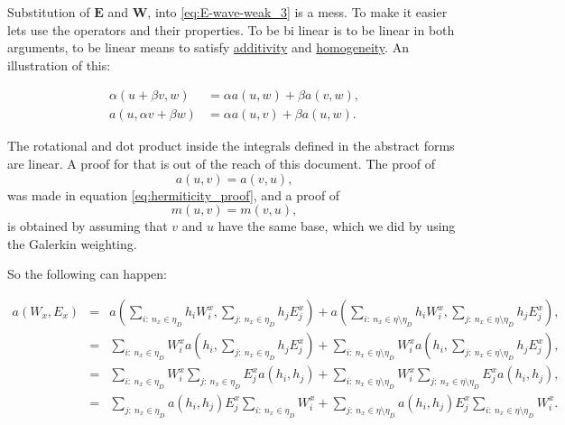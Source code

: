 Substitution of $\mathbf{E}$ and $\mathbf{W}$, into \ref{eq:E-wave-weak_3} is a mess. To make it easier lets use the operators and their properties. To be bi linear is to be linear in both arguments, to be linear means to satisfy \href{http://en.wikipedia.org/wiki/Additive_function}{additivity} and \href{http://en.wikipedia.org/wiki/Homogeneous_function}{homogeneity}. An illustration of this:

\begin{align*}
\alpha (u+\beta v, w)&=\alpha a(u,w)+\beta a(v,w),\\
a(u,\alpha v+\beta w)&=\alpha a(u,v)+\beta a(u,w).
\end{align*}

The rotational and dot product inside the integrals defined in the abstract forms are linear. A proof for that is out of the reach of this document. 
The proof of
\[a(u,v) = a(v,u),\]
was made in equation \ref{eq:hermiticity_proof}, and a proof of
\[m(u,v) = m(v,u),\]
is obtained by assuming that $v$ and $u$ have the same base, which we did by using the Galerkin weighting.

So the following can happen:

\begin{align}
a\left(W_x,E_x\right)&=& a\left( \sum_{i:\ n_x \in \eta_D} h_i W_i^x, \sum_{j:\ n_x \in \eta_D} h_j E_j^x\right)+a\left(\sum_{i:\ n_x \in \eta\setminus\eta_D} h_i W_i^x,\sum_{j:\ n_x \in \eta\setminus\eta_D} h_j E_j^x\right)\nonumber, \\
&=&  \sum_{i:\ n_x \in \eta_D}W_i^x a\left(  h_i , \sum_{j:\ n_x \in \eta_D} h_j E_j^x\right)+\sum_{i:\ n_x \in \eta\setminus\eta_D} W_i^x a\left( h_i,\sum_{j:\ n_x \in \eta\setminus\eta_D} h_j E_j^x\right)\nonumber,\\
&=&\sum_{i:\ n_x \in \eta_D}W_i^x \sum_{j:\ n_x \in \eta_D}E_j^x a\left(  h_i ,  h_j \right)+\sum_{i:\ n_x \in \eta\setminus\eta_D} W_i^x \sum_{j:\ n_x \in \eta\setminus\eta_D}  E_j^x a\left( h_i, h_j \right)\nonumber,\\
&=& \sum_{j:\ n_x \in \eta_D} a\left(  h_i ,  h_j \right)E_j^x \sum_{i:\ n_x \in \eta_D}W_i^x+\sum_{j:\ n_x \in \eta\setminus\eta_D}   a\left( h_i, h_j \right)E_j^x\sum_{i:\ n_x \in \eta\setminus\eta_D} W_i^x \label{eq:substitution_of_app_fields_in_a}.
\end{align}

